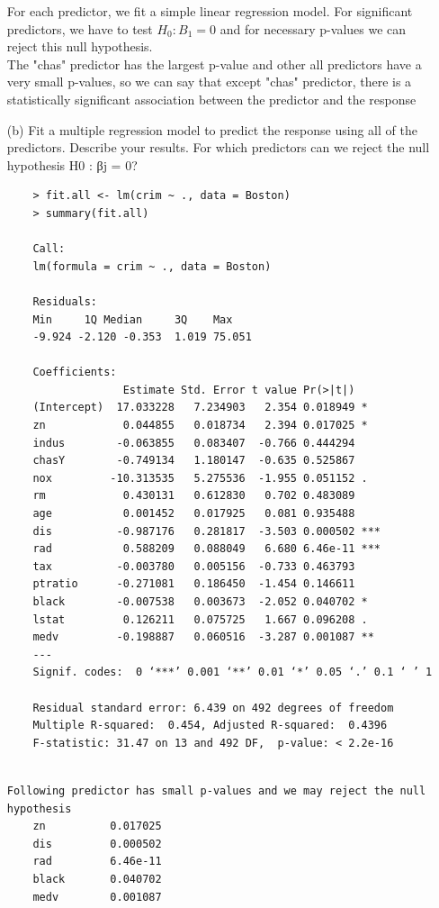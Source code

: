 \documentclass{article}
\begin{document}
\begin{itemize}
For each predictor, we fit a simple linear regression model. 
For significant predictors, we have to test $H_0 : B_1 = 0$ and for necessary p-values we can reject this null hypothesis.
\\The "chas"  predictor has the largest p-value  and other all predictors have a very small p-values, so we can say that  except "chas" predictor, there is a statistically significant association between the predictor and the response


\newpage

\item[(b)] Fit a multiple regression model to predict the response using all of the predictors. Describe your results. For which predictors can we reject the null hypothesis H0 : βj = 0?


\begin{program}
	\begin{verbatim}
	> fit.all <- lm(crim ~ ., data = Boston)
	> summary(fit.all)
	
	Call:
	lm(formula = crim ~ ., data = Boston)
	
	Residuals:
	Min     1Q Median     3Q    Max 
	-9.924 -2.120 -0.353  1.019 75.051 
	
	Coefficients:
	              Estimate Std. Error t value Pr(>|t|)    
	(Intercept)  17.033228   7.234903   2.354 0.018949 *  
	zn            0.044855   0.018734   2.394 0.017025 *  
	indus        -0.063855   0.083407  -0.766 0.444294    
	chasY        -0.749134   1.180147  -0.635 0.525867    
	nox         -10.313535   5.275536  -1.955 0.051152 .  
	rm            0.430131   0.612830   0.702 0.483089    
	age           0.001452   0.017925   0.081 0.935488    
	dis          -0.987176   0.281817  -3.503 0.000502 ***
	rad           0.588209   0.088049   6.680 6.46e-11 ***
	tax          -0.003780   0.005156  -0.733 0.463793    
	ptratio      -0.271081   0.186450  -1.454 0.146611    
	black        -0.007538   0.003673  -2.052 0.040702 *  
	lstat         0.126211   0.075725   1.667 0.096208 .  
	medv         -0.198887   0.060516  -3.287 0.001087 ** 
	---
	Signif. codes:  0 ‘***’ 0.001 ‘**’ 0.01 ‘*’ 0.05 ‘.’ 0.1 ‘ ’ 1
	
	Residual standard error: 6.439 on 492 degrees of freedom
	Multiple R-squared:  0.454,	Adjusted R-squared:  0.4396 
	F-statistic: 31.47 on 13 and 492 DF,  p-value: < 2.2e-16
	
	\end{verbatim}
\end{program}

\begin{lstlisting}
Following predictor has small p-values and we may reject the null hypothesis
	zn          0.017025
	dis         0.000502
	rad         6.46e-11
	black       0.040702  
	medv        0.001087 
\end{lstlisting}





\end{itemize}
\end{document}
